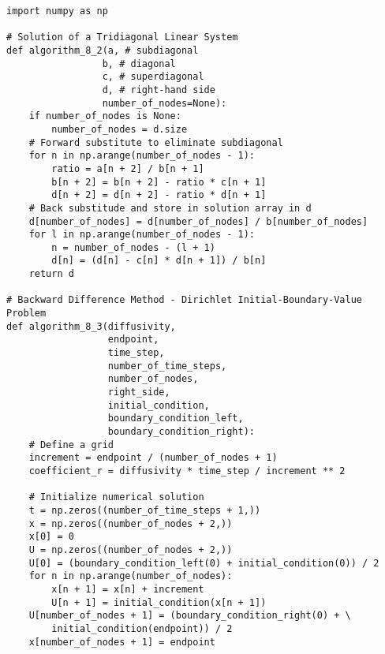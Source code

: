\documentclass{amsbook}%
\theoremstyle{plain}
\numberwithin{equation}{section}
\begin{document}
\begin{small}
\begin{verbatim}
import numpy as np

# Solution of a Tridiagonal Linear System
def algorithm_8_2(a, # subdiagonal
                 b, # diagonal
                 c, # superdiagonal
                 d, # right-hand side
                 number_of_nodes=None):
    if number_of_nodes is None:
        number_of_nodes = d.size
    # Forward substitute to eliminate subdiagonal
    for n in np.arange(number_of_nodes - 1):
        ratio = a[n + 2] / b[n + 1]
        b[n + 2] = b[n + 2] - ratio * c[n + 1]
        d[n + 2] = d[n + 2] - ratio * d[n + 1]
    # Back substitude and store in solution array in d
    d[number_of_nodes] = d[number_of_nodes] / b[number_of_nodes]
    for l in np.arange(number_of_nodes - 1):
        n = number_of_nodes - (l + 1)
        d[n] = (d[n] - c[n] * d[n + 1]) / b[n]
    return d
        
# Backward Difference Method - Dirichlet Initial-Boundary-Value Problem
def algorithm_8_3(diffusivity,
                  endpoint,
                  time_step,
                  number_of_time_steps,
                  number_of_nodes,
                  right_side,
                  initial_condition,
                  boundary_condition_left,
                  boundary_condition_right):
    # Define a grid
    increment = endpoint / (number_of_nodes + 1)
    coefficient_r = diffusivity * time_step / increment ** 2
        
    # Initialize numerical solution
    t = np.zeros((number_of_time_steps + 1,))
    x = np.zeros((number_of_nodes + 2,))
    x[0] = 0
    U = np.zeros((number_of_nodes + 2,))
    U[0] = (boundary_condition_left(0) + initial_condition(0)) / 2
    for n in np.arange(number_of_nodes):
        x[n + 1] = x[n] + increment
        U[n + 1] = initial_condition(x[n + 1])
    U[number_of_nodes + 1] = (boundary_condition_right(0) + \
    	initial_condition(endpoint)) / 2
    x[number_of_nodes + 1] = endpoint


\end{verbatim}
\end{small}
\end{document}
